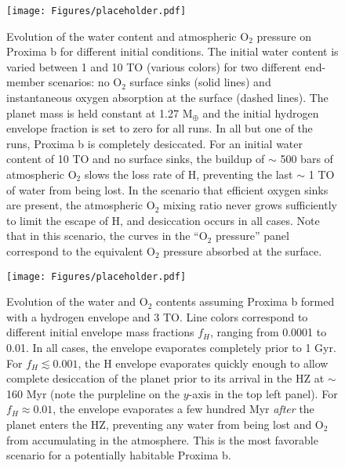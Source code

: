 \documentclass[preprint,12pt]{aastex}
\begin{document}
\begin{figure}[ht]
\centering
\texttt{[image: Figures/placeholder.pdf]}
\caption{Evolution of the water content and atmospheric O$_2$ pressure
  on Proxima b for different initial conditions. The initial water
  content is varied between 1 and 10 TO (various colors) for two
  different end-member scenarios: no O$_2$ surface sinks (solid lines)
  and instantaneous oxygen absorption at the surface (dashed
  lines). The planet mass is held constant at 1.27 M$_\oplus$ and the
  initial hydrogen envelope fraction is set to zero for all runs. In
  all but one of the runs, Proxima b is completely desiccated. For an
  initial water content of 10 TO and no surface sinks, the buildup of
  $\sim$ 500 bars of atmospheric O$_2$ slows the loss rate of H,
  preventing the last $\sim$ 1 TO of water from being lost. In the
  scenario that efficient oxygen sinks are present, the atmospheric
  O$_2$ mixing ratio never grows sufficiently to limit the escape of
  H, and desiccation occurs in all cases. Note that in this scenario,
  the curves in the ``O$_2$ pressure'' panel correspond to the
  equivalent O$_2$ pressure absorbed at the surface.\vspace{0.2in}}
\label{fig:atmesc:mirage}
\end{figure}

\begin{figure}[ht]
\centering
\texttt{[image: Figures/placeholder.pdf]}
\caption{Evolution of the water and O$_2$ contents assuming Proxima b
  formed with a hydrogen envelope and 3 TO. Line colors correspond to
  different initial envelope mass fractions $f_H$, ranging from 0.0001
  to 0.01. In all cases, the envelope evaporates completely prior to 1
  Gyr. For $f_H \lesssim 0.001$, the H envelope evaporates quickly
  enough to allow complete desiccation of the planet prior to its
  arrival in the HZ at $\sim$ 160 Myr (note the purpleline on the $y$-axis in the top left panel). For $f_H \approx 0.01$, the
  envelope evaporates a few hundred Myr \emph{after} the planet enters
  the HZ, preventing any water from being lost and O$_2$ from
  accumulating in the atmosphere.  This is the most favorable scenario
  for a potentially habitable Proxima b.\vspace{0.2in}}
\label{fig:atmesc:hec}
\end{figure}
\end{document}
